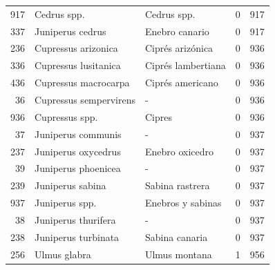 \begin{longtable}{r p{4cm} p{5cm} c c}
    917           & Cedrus spp.                       & Cedrus spp.                                   & 0             & 917            \\
    337           & Juniperus cedrus                  & Enebro canario                                & 0             & 917            \\
    236           & Cupressus arizonica               & Ciprés arizónica                              & 0             & 936            \\
    336           & Cupressus lusitanica              & Ciprés lambertiana                            & 0             & 936            \\
    436           & Cupressus macrocarpa              & Ciprés americano                              & 0             & 936            \\
    36            & Cupressus sempervirens            & -                                             & 0             & 936            \\
    936           & Cupressus spp.                    & Cipres                                        & 0             & 936            \\
    37            & Juniperus communis                & -                                             & 0             & 937            \\
    237           & Juniperus oxycedrus               & Enebro oxicedro                               & 0             & 937            \\
    39            & Juniperus phoenicea               & -                                             & 0             & 937            \\
    239           & Juniperus sabina                  & Sabina rastrera                               & 0             & 937            \\
    937           & Juniperus spp.                    & Enebros y sabinas                             & 0             & 937            \\
    38            & Juniperus thurifera               & -                                             & 0             & 937            \\
    238           & Juniperus turbinata               & Sabina canaria                                & 0             & 937            \\
    256           & Ulmus glabra                      & Ulmus montana                                 & 1             & 956            \\

\end{longtable}
